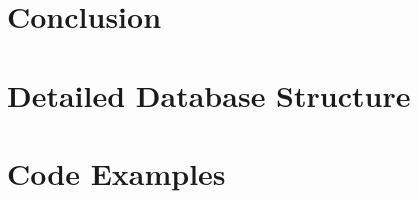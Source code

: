 \documentclass[draft,final]{vutinfth} %
\begin{document}
    \chapter{Conclusion}\label{ch:conclusion}
    
    

    \appendix
    \chapter{Detailed Database Structure}\label{ch:database-structure}
    
    \chapter{Code Examples}\label{ch:code-examples}
    

    \backmatter

    \listoffigures %

    \cleardoublepage %

    
    
\end{document}
